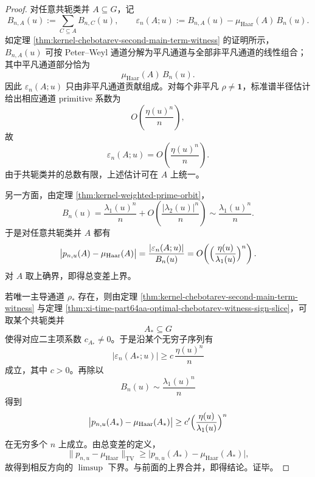 \begin{proof}
对任意共轭类并 \(A\subseteq G\)，记
\[
B_{n,A}(u):=\sum_{C\subseteq A}B_{n,C}(u),
\qquad
\varepsilon_n(A;u):=
B_{n,A}(u)-\mu_{\mathrm{Haar}}(A)\,B_n(u).
\]
如定理 \ref{thm:kernel-chebotarev-second-main-term-witness} 的证明所示，\(B_{n,A}(u)\) 可按 Peter--Weyl 通道分解为平凡通道与全部非平凡通道的线性组合；其中平凡通道部分恰为
\[
\mu_{\mathrm{Haar}}(A)\,B_n(u).
\]
因此 \(\varepsilon_n(A;u)\) 只由非平凡通道贡献组成。对每个非平凡 \(\rho\neq \mathbf 1\)，标准谱半径估计给出相应通道 primitive 系数为
\[
O\!\left(\frac{\eta(u)^n}{n}\right),
\]
故
\[
\varepsilon_n(A;u)=O\!\left(\frac{\eta(u)^n}{n}\right).
\]
由于共轭类并的总数有限，上述估计可在 \(A\) 上统一。

另一方面，由定理 \ref{thm:kernel-weighted-prime-orbit}，
\[
B_n(u)=\frac{\lambda_1(u)^n}{n}+O\!\left(\frac{|\lambda_2(u)|^n}{n}\right)
\sim \frac{\lambda_1(u)^n}{n}.
\]
于是对任意共轭类并 \(A\) 都有
\[
\bigl|p_{n,u}(A)-\mu_{\mathrm{Haar}}(A)\bigr|
=
\frac{|\varepsilon_n(A;u)|}{B_n(u)}
=
O\!\left(\Bigl(\frac{\eta(u)}{\lambda_1(u)}\Bigr)^n\right).
\]
对 \(A\) 取上确界，即得总变差上界。

若唯一主导通道 \(\rho_\ast\) 存在，则由定理
\ref{thm:kernel-chebotarev-second-main-term-witness} 与定理
\ref{thm:xi-time-part64aa-optimal-chebotarev-witness-sign-slice}，可取某个共轭类并
\[
A_\ast\subseteq G
\]
使得对应二主项系数 \(c_{A_\ast}\neq 0\)。于是沿某个无穷子序列有
\[
|\varepsilon_n(A_\ast;u)|
\ge
c\,\frac{\eta(u)^n}{n}
\]
成立，其中 \(c>0\)。再除以
\[
B_n(u)\sim \frac{\lambda_1(u)^n}{n}
\]
得到
\[
\bigl|p_{n,u}(A_\ast)-\mu_{\mathrm{Haar}}(A_\ast)\bigr|
\ge
c'\Bigl(\frac{\eta(u)}{\lambda_1(u)}\Bigr)^n
\]
在无穷多个 \(n\) 上成立。由总变差的定义，
\[
\|p_{n,u}-\mu_{\mathrm{Haar}}\|_{\mathrm{TV}}
\ge
\bigl|p_{n,u}(A_\ast)-\mu_{\mathrm{Haar}}(A_\ast)\bigr|,
\]
故得到相反方向的 \(\limsup\) 下界。与前面的上界合并，即得结论。证毕。
\end{proof}

